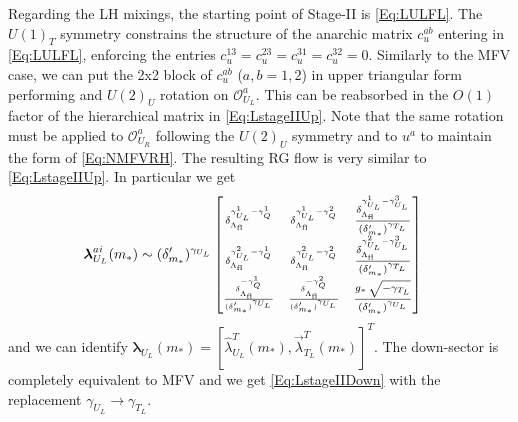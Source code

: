 \documentclass[aps,prl,twocolumn,showpacs,10pt,preprintnumbers,nofootinbib]{revtex4-2}
\newcommand{\gst}{g_*}
\newcommand{\mst}{m_*}
\newcommand{\Lfl}{\Lambda_{\text{fl}}}
\newcommand{\op}{\mathcal{O}}
\begin{document}
{Regarding the LH mixings, the starting point of Stage-II is \eqref{Eq:LULFL}. The $U(1)_T$ symmetry constrains the structure of the anarchic matrix $c_u^{ab}$ entering in \eqref{Eq:LULFL}, enforcing the entries $c_u^{13} = c_u^{23} = c_u^{31} = c_u^{32} = 0$. Similarly to the MFV case, we can put the 2x2 block of $c_u^{ab}$ ($a,b =1,2$) in upper triangular form performing and $U(2)_U$ rotation on $\op_{U_L}^a$. This can be reabsorbed in the $O(1)$ factor of the hierarchical matrix in \eqref{Eq:LstageIIUp}. Note that the same rotation must be applied to $\op_{U_R}^a$ following the $U(2)_U$ symmetry and to $u^a$ to maintain the form of \eqref{Eq:NMFVRH}. The resulting RG flow is very similar to \eqref{Eq:LstageIIUp}. In particular we get
\begin{align}\label{Eq:LstageIIUpNMFV}
\boldsymbol{\lambda}_{U_L}^{ai}(\mst) &\sim (\delta'_{\mst})^{\gamma_{U_L}}
\scriptsize
\begin{bmatrix}
\delta_{\Lfl}^{\gamma_{U_L}^1-\gamma_Q^1} & \delta_{\Lfl}^{\gamma_{U_L}^1-\gamma_Q^2} & \dfrac{\delta_{\Lfl}^{\gamma_{U_L}^1-\gamma_{U_L}^3}}{(\delta'_{\mst})^{\gamma_{T_L}}} \\
\delta_{\Lfl}^{\gamma_{U_L}^2-\gamma_Q^1} & \delta_{\Lfl}^{\gamma_{U_L}^2-\gamma_Q^2} & \dfrac{\delta_{\Lfl}^{\gamma_{U_L}^2-\gamma_{U_L}^3}}{(\delta'_{\mst})^{\gamma_{T_L}}} \\
\frac{\delta_{\Lfl}^{-\gamma_Q^1}}{(\delta'_{\mst})^{\gamma_{U_L}}} & \frac{\delta_{\Lfl}^{-\gamma_Q^2}}{(\delta'_{\mst})^{\gamma_{U_L}}} & \dfrac{\gst\,\sqrt{-\gamma_{T_L}}}{(\delta'_{\mst})^{\gamma_{U_L}}}
\end{bmatrix}
\normalsize
\end{align}
and we can identify $\boldsymbol{\lambda}_{U_L}(\mst)= \left[ \hat{\lambda}_{U_L}^T(\mst),\vec{\lambda}_{T_L}^T (\mst)\right]^T$. The down-sector is completely equivalent to MFV and we get \eqref{Eq:LstageIIDown} with the replacement $\gamma_{U_L}\rightarrow \gamma_{T_L}$.

}
\end{document}
